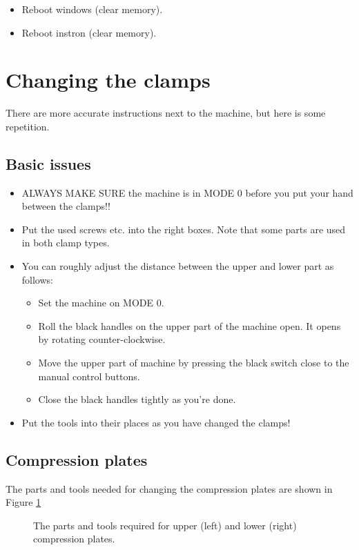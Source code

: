 \documentclass[a4paper]{article}
\begin{document}
\begin{itemize}
  \item Reboot windows (clear memory).
  \item Reboot instron (clear memory).
\end{itemize}

\section{Changing the clamps}

There are more accurate instructions next to the machine, but here is some repetition. 

\subsection{Basic issues}

\begin{itemize}
  \item ALWAYS MAKE SURE the machine is in \textsf{MODE 0} before you put your hand between the clamps!!
  \item Put the used screws etc. into the right boxes. Note that some parts are used in both clamp types.
  \item You can roughly adjust the distance between the upper and lower part as follows:
  \begin{itemize}
    \item Set the machine on \textsf{MODE 0}.
    \item Roll the black handles on the upper part of the machine open. It opens by rotating counter-clockwise.
    \item Move the upper part of machine by pressing the black switch close to the manual control buttons.
    \item Close the black handles tightly as you're done.
  \end{itemize}
  \item Put the tools into their places as you have changed the clamps!
\end{itemize}

\subsection{Compression plates}

The parts and tools needed for changing the compression plates are shown in Figure \ref{compparts}

\begin{figure}[t]
\centering 
{}
\caption{The parts and tools required for upper (left) and lower (right) compression plates.}
\label{compparts}
\end{figure}
\end{document}
